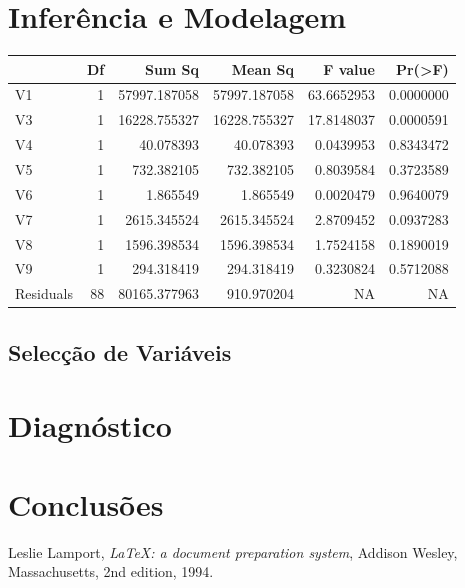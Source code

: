 \documentclass[runningheads]{llncs}\usepackage[]{graphicx}\usepackage[]{color}
\newenvironment{knitrout}{}{} %
\begin{document}
%
\section{Inferência e Modelagem}%
\begin{knitrout}
\color{fgcolor}\begin{table}[H]
\centering
\begin{tabular}{l|r|r|r|r|r}
\hline
  & Df & Sum Sq & Mean Sq & F value & Pr(>F)\\
\hline
V1 & 1 & 57997.187058 & 57997.187058 & 63.6652953 & 0.0000000\\
\hline
V3 & 1 & 16228.755327 & 16228.755327 & 17.8148037 & 0.0000591\\
\hline
V4 & 1 & 40.078393 & 40.078393 & 0.0439953 & 0.8343472\\
\hline
V5 & 1 & 732.382105 & 732.382105 & 0.8039584 & 0.3723589\\
\hline
V6 & 1 & 1.865549 & 1.865549 & 0.0020479 & 0.9640079\\
\hline
V7 & 1 & 2615.345524 & 2615.345524 & 2.8709452 & 0.0937283\\
\hline
V8 & 1 & 1596.398534 & 1596.398534 & 1.7524158 & 0.1890019\\
\hline
V9 & 1 & 294.318419 & 294.318419 & 0.3230824 & 0.5712088\\
\hline
Residuals & 88 & 80165.377963 & 910.970204 & NA & NA\\
\hline
\end{tabular}
\end{table}


\end{knitrout}

\subsection{Selecção de Variáveis}
\section{Diagnóstico }
\section{Conclusões}

\begin{thebibliography}{9}
\newpage
{}
  Leslie Lamport,
  \textit{\LaTeX: a document preparation system},
  Addison Wesley, Massachusetts,
  2nd edition,
  1994.

\end{thebibliography}
\newpage
\end{document}
